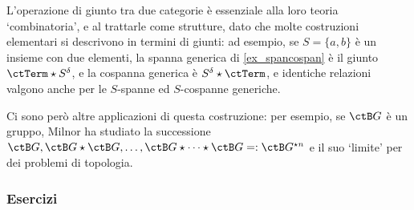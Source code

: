 L'operazione di giunto tra due categorie è essenziale alla loro teoria `combinatoria', e al trattarle come strutture, dato che molte costruzioni elementari si descrivono in termini di giunti: ad esempio, se \(S=\{a,b\}\) è un insieme con due elementi, la spanna generica di \ref{ex_spancospan} è il giunto \(\ctTerm\star S^\delta\), e la cospanna generica è \(S^\delta\star\ctTerm\), e identiche relazioni valgono anche per le \(S\)-spanne ed \(S\)-cospanne generiche.

Ci sono però altre applicazioni di questa costruzione: per esempio, se \(\ctB G\) è un gruppo, Milnor \cite{milnor1,milnor2} ha studiato la successione \(\ctB G, \ctB G\star\ctB G, \dots, \ctB G \star\dots\star \ctB G =:\ctB G^{\star n}\) e il suo `limite' per dei problemi di topologia.
\subsubsection*{Esercizi}
